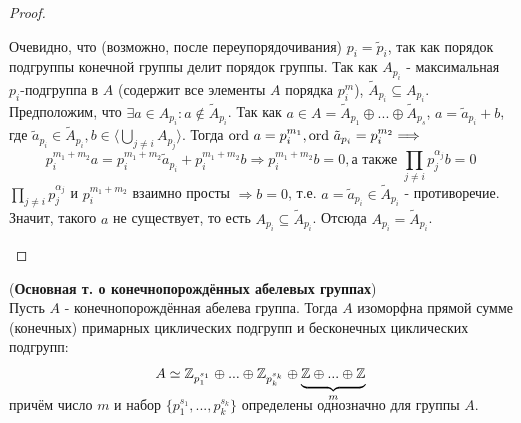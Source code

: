 \begin{proof}
\begin{itemize}
        Очевидно, что (возможно, после переупорядочивания) $p_i = \tilde{p}_i$, так как порядок подгруппы конечной группы делит порядок группы. Так как $A_{p_i}$ - максимальная $p_i$-подгруппа в $A$ (содержит все элементы $A$ порядка $p_i^m$), $\tilde{A}_{p_i} \subseteq A_{p_i}$.\\
        Предположим, что $\exists a \in A_{p_i}: a \notin \tilde{A}_{p_i}$. Так как $a \in A = \tilde{A}_{p_1} \oplus ... \oplus \tilde{A}_{p_s}$, $a = \tilde{a}_{p_i} + b$, где $\tilde{a}_{p_i} \in \tilde{A}_{p_i}, b \in \langle \bigcup \limits_{j \neq i} A_{p_j} \rangle$. Тогда $\textup{ord } a = p_i^{m_1}, \textup{ord } \tilde{a}_{p_i} = p_i^{m_2} \Longrightarrow$
        \[ p_i^{m_1 + m_2}a = p_i^{m_1 + m_2}\tilde{a}_{p_i} + p_i^{m_1 + m_2}b \Longrightarrow p_i^{m_1 + m_2}b = 0, \text{а также } \prod \limits_{j \neq i} p_j^{\alpha_j} b = 0\]
        $\prod \limits_{j \neq i} p_j^{\alpha_j}$ и $p_i^{m_1+m_2}$ взаимно просты $\Longrightarrow b = 0$, т.е. $a = \tilde{a}_{p_i} \in \tilde{A}_{p_i}$ - противоречие.\\
        Значит, такого $a$ не существует, то есть $A_{p_i} \subseteq \tilde{A}_{p_i}$. Отсюда $A_{p_i} = \tilde{A}_{p_i}$.
    \end{itemize}
\end{proof}
\begin{theorem}(\textbf{Основная т. о конечнопорождённых абелевых группах})\\
    Пусть $A$ - конечнопорождённая абелева группа. Тогда $A$ изоморфна прямой сумме (конечных) примарных циклических подгрупп и бесконечных циклических подгрупп:
    \[A \simeq \Z_{p_1^{s_1}} \oplus ... \oplus \Z_{p_k^{s_k}} \oplus \undermat{m}{\Z \oplus ... \oplus \Z}\]
    \newline
    причём число $m$ и набор $\{p_1^{s_1},...,p_k^{s_k}\}$ определены однозначно для группы $A$.
\end{theorem}
